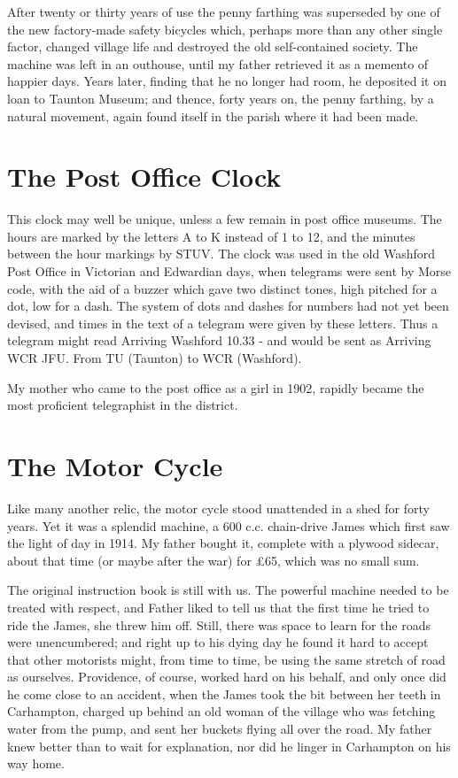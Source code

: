  
After twenty or thirty years of use the penny farthing was superseded by one of the new factory-made safety bicycles which, perhaps more than any other single factor, changed village life and destroyed the old self-contained society. The machine was left in an outhouse, until my father retrieved it as a memento of happier days. Years later, finding that he no longer had room, he deposited it on loan to Taunton Museum; and thence, forty years on, the penny farthing, by a natural movement, again found itself in the parish where it had been made.
 
\section{The Post Office Clock}

This clock may well be unique, unless a few remain in post office museums. The hours are marked by the letters A to K instead of 1 to 12, and the minutes between the hour markings by STUV. The clock was used in the old Washford Post Office in Victorian and Edwardian days, when telegrams were sent by Morse code, with the aid of a buzzer which gave two distinct tones, high pitched for a dot, low for a dash. The system of dots and dashes for numbers had not yet been devised, and times in the text of a telegram were given by these letters. Thus a telegram might read Arriving Washford 10.33 - and would be sent as Arriving WCR JFU. From TU (Taunton) to WCR (Washford).

My mother who came to the post office as a girl in 1902, rapidly became the most proficient telegraphist in the district.
 
\section{The Motor Cycle}

Like many another relic, the motor cycle stood unattended in a shed for forty years. Yet it was a splendid machine, a 600 c.c. chain-drive James which first saw the light of day in 1914. My father bought it, complete with a plywood sidecar, about that time (or maybe after the war) for £65, which was no small sum.

The original instruction book is still with us. The powerful machine needed to be treated with respect, and Father liked to tell us that the first time he tried to ride the James, she threw him off. Still, there was space to learn for the roads were unencumbered; and right up to his dying day he found it hard to accept that other motorists might, from time to time, be using the same stretch of road as ourselves. Providence, of course, worked hard on his behalf, and only once did he come close to an accident, when the James took the bit between her teeth in Carhampton, charged up behind an old woman of the village who was fetching water from the pump, and sent her buckets flying all over the road. My father knew better than to wait for explanation, nor did he linger in Carhampton on his way home. 

